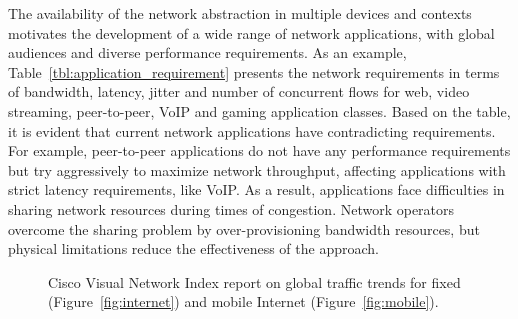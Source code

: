 The availability of the network abstraction in multiple devices and contexts
motivates the development of a wide range of network applications, with global
audiences and diverse performance requirements.  As an example,
Table~\ref{tbl:application_requirement} presents the network requirements in
terms of bandwidth, latency, jitter and number of concurrent flows for web,
video streaming, peer-to-peer,  VoIP and gaming application classes.  Based on
the table, it is evident that current network applications have contradicting
requirements. For example, peer-to-peer applications do not have any
performance requirements but try aggressively to maximize network throughput,
affecting applications with strict latency requirements, like VoIP\@.  As a
result, applications face difficulties in sharing network resources during
times of congestion. Network operators overcome the sharing problem by
over-provisioning bandwidth resources, but physical limitations reduce the
effectiveness of the approach. 

\begin{figure}[] 
  \caption[Cisco Visual Network Index report on global traffic trends]{Cisco
    Visual Network Index report on global traffic trends
    for fixed (Figure~\ref{fig:internet}) and mobile Internet (Figure~\ref{fig:mobile}).}
  \label{fig:internet_applications} 
\end{figure}

